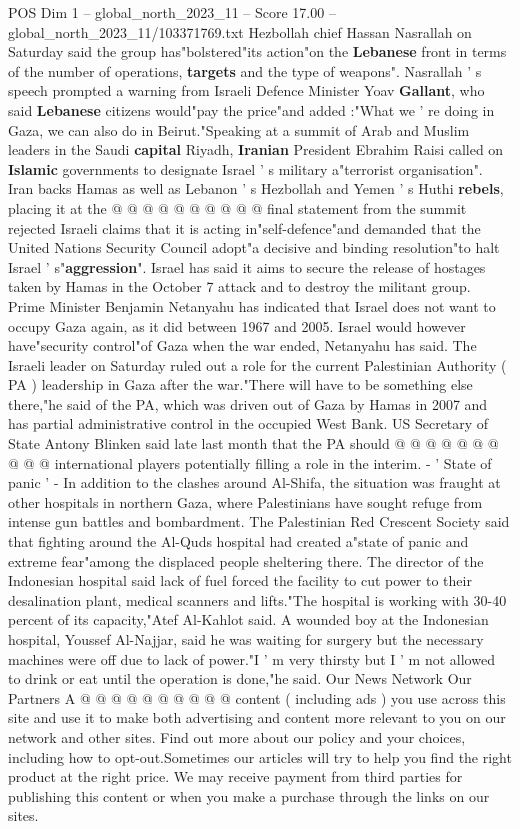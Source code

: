 \begin{textsample}{POS Dim 1 – global\_north\_2023\_11 – Score 17.00 – global\_north\_2023\_11/103371769.txt}
Hezbollah chief Hassan Nasrallah on Saturday said the group has"bolstered"its action"on the \textbf{Lebanese} front in terms of the number of operations, \textbf{targets} and the type of weapons".
Nasrallah ' s speech prompted a warning from Israeli Defence Minister Yoav \textbf{Gallant}, who said \textbf{Lebanese} citizens would"pay the price"and added :"What we ' re doing in Gaza, we can also do in Beirut."Speaking at a summit of Arab and Muslim leaders in the Saudi \textbf{capital} Riyadh, \textbf{Iranian} President Ebrahim Raisi called on \textbf{Islamic} governments to designate Israel ' s military a"terrorist organisation".
Iran backs Hamas as well as Lebanon ' s Hezbollah and Yemen ' s Huthi \textbf{rebels}, placing it at the @ @ @ @ @ @ @ @ @ @ final statement from the summit rejected Israeli claims that it is acting in"self-defence"and demanded that the United Nations Security Council adopt"a decisive and binding resolution"to halt Israel ' s"\textbf{aggression}".
Israel has said it aims to secure the release of hostages taken by Hamas in the October 7 attack and to destroy the militant group.
Prime Minister Benjamin Netanyahu has indicated that Israel does not want to occupy Gaza again, as it did between 1967 and 2005.
Israel would however have"security control"of Gaza when the war ended, Netanyahu has said.
The Israeli leader on Saturday ruled out a role for the current Palestinian Authority ( PA ) leadership in Gaza after the war."There will have to be something else there,"he said of the PA, which was driven out of Gaza by Hamas in 2007 and has partial administrative control in the occupied West Bank.
US Secretary of State Antony Blinken said late last month that the PA should @ @ @ @ @ @ @ @ @ @ international players potentially filling a role in the interim. - ' State of panic ' - In addition to the clashes around Al-Shifa, the situation was fraught at other hospitals in northern Gaza, where Palestinians have sought refuge from intense gun battles and bombardment.
The Palestinian Red Crescent Society said that fighting around the Al-Quds hospital had created a"state of panic and extreme fear"among the displaced people sheltering there.
The director of the Indonesian hospital said lack of fuel forced the facility to cut power to their desalination plant, medical scanners and lifts."The hospital is working with 30-40 percent of its capacity,"Atef Al-Kahlot said.
A wounded boy at the Indonesian hospital, Youssef Al-Najjar, said he was waiting for surgery but the necessary machines were off due to lack of power."I ' m very thirsty but I ' m not allowed to drink or eat until the operation is done,"he said.
Our News Network Our Partners A @ @ @ @ @ @ @ @ @ @ content ( including ads ) you use across this site and use it to make both advertising and content more relevant to you on our network and other sites.
Find out more about our policy and your choices, including how to opt-out.Sometimes our articles will try to help you find the right product at the right price.
We may receive payment from third parties for publishing this content or when you make a purchase through the links on our sites.


\end{textsample}
